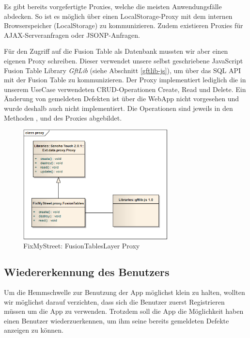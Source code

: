 Es gibt bereits vorgefertigte Proxies, welche die meisten Anwendungsfälle abdecken. So ist es möglich über einen LocalStorage-Proxy mit dem internen Browserspeicher (LocalStorage) zu kommunizieren. Zudem existieren Proxies für AJAX-Serveranfragen oder JSONP-Anfragen.

Für den Zugriff auf die Fusion Table als Datenbank mussten wir aber einen eigenen Proxy schreiben. Dieser verwendet unsere selbst geschriebene JavaScript Fusion Table Library \emph{GftLib} (siehe Abschnitt \ref{gftlib-js}), um über das SQL API mit der Fusion Table zu kommunizieren.
Der Proxy implementiert lediglich die in unserem UseCase verwendeten CRUD-Operationen Create, Read und Delete. Ein Änderung von gemeldeten Defekten ist über die WebApp nicht vorgesehen und wurde deshalb auch nicht implementiert.
Die Operationen sind jeweils in den Methoden ,  und  des Proxies abgebildet.

\begin{figure}[H]
	\centering
	\includegraphics[width=0.7\textwidth]{images/usecase2-fixmystreet/uml/fixmystreet-proxy-classmodel}
	\caption{FixMyStreet: FusionTablesLayer Proxy}
	\label{fixmystreet-proxy-classmodel}
\end{figure}

\subsection{Wiedererkennung des Benutzers}
\label{fixmystreet-user-detection}
Um die Hemmschwelle zur Benutzung der App möglichst klein zu halten, wollten wir möglichst darauf verzichten, dass sich die Benutzer zuerst Registrieren müssen um die App zu verwenden. Trotzdem soll die App die Möglichkeit haben einen Benutzer wiederzuerkennen, um ihm seine bereits gemeldeten Defekte anzeigen zu können.


